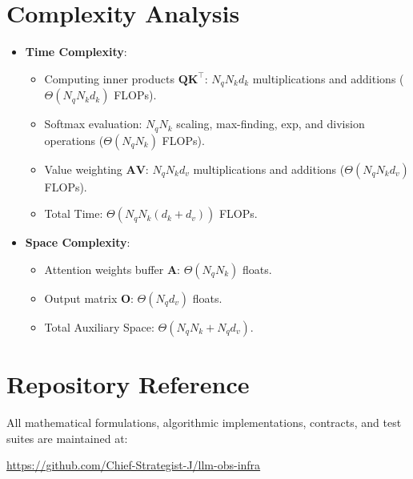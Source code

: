 \documentclass[11pt,a4paper]{article}
\theoremstyle{definition}
\begin{document}
\section{Complexity Analysis}
\begin{itemize}
    \item \textbf{Time Complexity}:
    \begin{itemize}
        \item Computing inner products $\mathbf{Q}\mathbf{K}^\top$: $N_q N_k d_k$ multiplications and additions ($\Theta(N_q N_k d_k)$ FLOPs).
        \item Softmax evaluation: $N_q N_k$ scaling, max-finding, exp, and division operations ($\Theta(N_q N_k)$ FLOPs).
        \item Value weighting $\mathbf{A}\mathbf{V}$: $N_q N_k d_v$ multiplications and additions ($\Theta(N_q N_k d_v)$ FLOPs).
        \item Total Time: $\Theta(N_q N_k(d_k + d_v))$ FLOPs.
    \end{itemize}
    \item \textbf{Space Complexity}:
    \begin{itemize}
        \item Attention weights buffer $\mathbf{A}$: $\Theta(N_q N_k)$ floats.
        \item Output matrix $\mathbf{O}$: $\Theta(N_q d_v)$ floats.
        \item Total Auxiliary Space: $\Theta(N_q N_k + N_q d_v)$.
    \end{itemize}
\end{itemize}

\section{Repository Reference}
All mathematical formulations, algorithmic implementations, contracts, and test suites are maintained at:
\begin{center}
\url{https://github.com/Chief-Strategist-J/llm-obs-infra}
\end{center}
\end{document}
